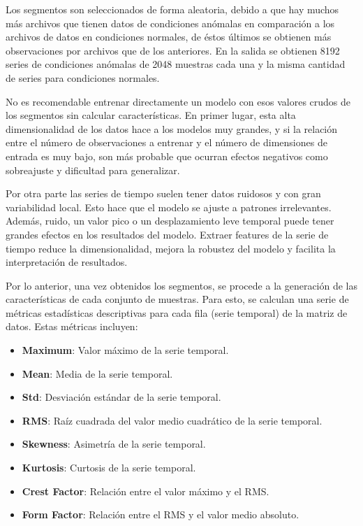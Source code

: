 \documentclass[11pt,a4paper,spanish]{book}
\numberwithin{equation}{chapter}
\numberwithin{figure}{chapter}
\begin{document}
Los segmentos son seleccionados de forma aleatoria, debido a que hay muchos más archivos 
que tienen datos de condiciones anómalas en comparación a los archivos de datos en 
condiciones normales, de éstos últimos se obtienen más observaciones por archivos que 
de los anteriores. En la salida se obtienen 8192 series de condiciones anómalas de 2048 
muestras cada una y la misma cantidad de series para condiciones normales. 


No es recomendable entrenar directamente un modelo con esos valores crudos de los 
segmentos sin calcular características. En primer lugar, esta alta dimensionalidad de 
los datos hace a los modelos muy grandes, y si la relación entre el número de 
observaciones a entrenar y el número de dimensiones de entrada es muy bajo, son más 
probable que ocurran  efectos negativos como sobreajuste y dificultad para generalizar. 


Por otra parte las series de tiempo suelen tener datos ruidosos y con gran variabilidad 
local. Esto hace que el modelo se ajuste a patrones irrelevantes.  Además, ruido, un 
valor pico o un desplazamiento leve temporal puede tener grandes efectos en los 
resultados del modelo. Extraer features de la serie de tiempo reduce la dimensionalidad, 
mejora la robustez del modelo y facilita la interpretación de resultados. 


Por lo anterior, una vez obtenidos los segmentos, se procede a la generación de las 
características de cada conjunto de muestras. Para esto, se calculan una serie de 
métricas estadísticas descriptivas para cada fila (serie temporal) de la matriz de 
datos. Estas métricas incluyen:

\begin{itemize}
\item \textbf{Maximum}: Valor máximo de la serie temporal.
\item \textbf{Mean}: Media de la serie temporal.
\item \textbf{Std}: Desviación estándar de la serie temporal.
\item \textbf{RMS}: Raíz cuadrada del valor medio cuadrático de la serie temporal.
\item \textbf{Skewness}: Asimetría de la serie temporal.
\item \textbf{Kurtosis}: Curtosis de la serie temporal.
\item \textbf{Crest Factor}: Relación entre el valor máximo y el RMS.
\item \textbf{Form Factor}: Relación entre el RMS y el valor medio absoluto.
\end{itemize}
\end{document}
